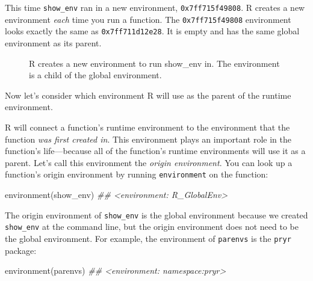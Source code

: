 \documentclass[
  letterpaper,
  DIV=11,
  numbers=noendperiod]{scrbook}
\makeatletter
\newenvironment{Shaded}{\begin{snugshade}}{\end{snugshade}}
\newcommand{\DocumentationTok}[1]{\textcolor[rgb]{0.37,0.37,0.37}{\textit{#1}}}
\newcommand{\FunctionTok}[1]{\textcolor[rgb]{0.28,0.35,0.67}{#1}}
\newcommand{\NormalTok}[1]{\textcolor[rgb]{0.00,0.23,0.31}{#1}}
\newcommand*\pandocbounded[1]{%
  \sbox\pandoc@box{#1}%
  \Gscale@div\@tempa{\textheight}{\dimexpr\ht\pandoc@box+\dp\pandoc@box\relax}%
  \Gscale@div\@tempb{\linewidth}{\wd\pandoc@box}%
  \ifdim\@tempb\p@<\@tempa\p@\let\@tempa\@tempb\fi%
  \ifdim\@tempa\p@<\p@\scalebox{\@tempa}{\usebox\pandoc@box}%
  \else\usebox{\pandoc@box}%
  \fi%
}
\makeatother
\begin{document}
This time \texttt{show\_env} ran in a new environment,
\texttt{0x7ff715f49808}. R creates a new environment \emph{each} time
you run a function. The \texttt{0x7ff715f49808} environment looks
exactly the same as \texttt{0x7ff711d12e28}. It is empty and has the
same global environment as its parent.

\begin{figure}

\centering{

\pandocbounded{\texttt{[image: images/hopr\_0604.png]}}

}

\caption{\label{fig-tree}R creates a new environment to run show\_env
in. The environment is a child of the global environment.}

\end{figure}%

Now let's consider which environment R will use as the parent of the
runtime environment.

R will connect a function's runtime environment to the environment that
the function \emph{was first created in}. This environment plays an
important role in the function's life---because all of the function's
runtime environments will use it as a parent. Let's call this
environment the \emph{origin environment}. You can look up a function's
origin environment by running \texttt{environment} on the function:

\begin{Shaded}
\begin{Highlighting}[]
\FunctionTok{environment}\NormalTok{(show\_env)}
\DocumentationTok{\#\# \textless{}environment: R\_GlobalEnv\textgreater{}}
\end{Highlighting}
\end{Shaded}

The origin environment of \texttt{show\_env} is the global environment
because we created \texttt{show\_env} at the command line, but the
origin environment does not need to be the global environment. For
example, the environment of \texttt{parenvs} is the \texttt{pryr}
package:

\begin{Shaded}
\begin{Highlighting}[]
\FunctionTok{environment}\NormalTok{(parenvs)}
\DocumentationTok{\#\# \textless{}environment: namespace:pryr\textgreater{}}
\end{Highlighting}
\end{Shaded}
\end{document}

